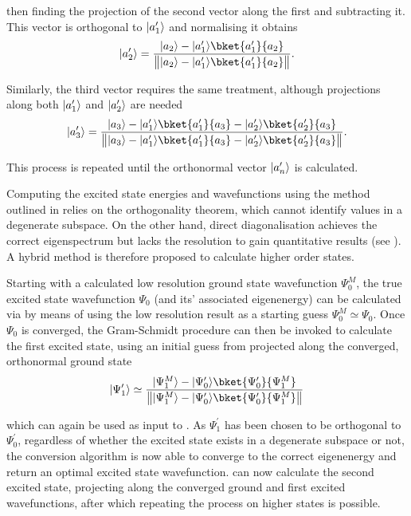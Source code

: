 then finding the projection of the second vector along the first and subtracting it.
This vector is orthogonal to $\lvert a^\prime_1\rangle$ and normalising it obtains
\begin{equation}
\ket{a^\prime_2} = \frac{\ket{a_2}-\ket{a^\prime_1}\bket{a^\prime_1}{a_2}}{\norm[\big]{\ket{a_2}-\ket{a^\prime_1}\bket{a^\prime_1}{a_2}}}.
\end{equation}

Similarly, the third vector requires the same treatment, although projections along both $\lvert a^\prime_1\rangle$ and $\lvert a^\prime_2\rangle$ are needed
\begin{equation}
\ket{a^\prime_3} = \frac{\ket{a_3}-\ket{a^\prime_1}\bket{a^\prime_1}{a_3}-\ket{a^\prime_2}\bket{a^\prime_2}{a_3}}{\norm[\big]{\ket{a_3}-\ket{a^\prime_1}\bket{a^\prime_1}{a_3}-\ket{a^\prime_2}\bket{a^\prime_2}{a_3}}}.\label{eq:gs3ex}
\end{equation}

This process is repeated until the orthonormal vector $\lvert a^\prime_n\rangle$ is calculated.

Computing the excited state energies and wavefunctions using the method outlined in  relies on the orthogonality theorem, which cannot identify values in a degenerate subspace.
On the other hand, direct diagonalisation achieves the correct eigenspectrum but lacks the resolution to gain quantitative results (see ).
A hybrid method is therefore proposed to calculate higher order states.

Starting with a  calculated low resolution ground state wavefunction $\Psi_0^{M}$, the true excited state wavefunction $\Psi_0$ (and its' associated eigenenergy) can be calculated via  by means of using the low resolution result as a starting guess $\Psi_0^{M} \simeq \Psi_0$.
Once $\Psi_0$ is converged, the Gram-Schmidt procedure can then be invoked to calculate the first excited state, using an initial guess from  projected along the converged, orthonormal ground state
\begin{equation}
    \ket{\Psi^\prime_1} \simeq \frac{\ket{\Psi^M_1} - \ket{\Psi^\prime_0}\bket{\Psi^\prime_0}{\Psi^M_1}}{\norm[\big]{\ket{\Psi^M_1} - \ket{\Psi^\prime_0}\bket{\Psi^\prime_0}{\Psi^M_1}}}
\end{equation}

which can again be used as input to .
As $\Psi^\prime_1$ has been chosen to be orthogonal to $\Psi^\prime_0$, regardless of whether the excited state exists in a degenerate subspace or not, the conversion algorithm is now able to converge to the correct eigenenergy and return an optimal excited state wavefunction.
 can now calculate the second excited state, projecting along the converged ground and first excited wavefunctions, after which repeating the process  on higher states is possible.


